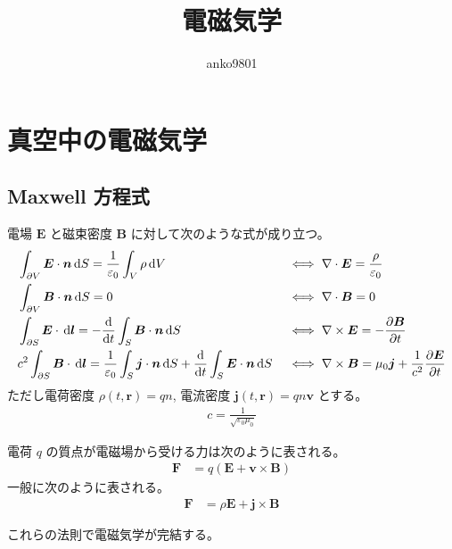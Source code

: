 \documentclass[uplatex,dvipdfmx,a4paper,11pt]{jlreq}
\title{電磁気学}
\author{anko9801}
\newcommand{\EE}{\bm{E}}
\newcommand{\BB}{\bm{B}}
\newcommand{\rr}{\bm{r}}
\newcommand{\vnabla}{\mathbf{\nabla}}
\numberwithin{equation}{section}
\theoremstyle{definition}
\begin{document}
\maketitle
\tableofcontents
\clearpage

\section{真空中の電磁気学}
\subsection{Maxwell 方程式}
\begin{definition}
  電場 $\EE$ と磁束密度 $\BB$ に対して次のような式が成り立つ。
  \begin{align}
     & \int_{\partial V}\EE\cdot\bm{n}\dl{S} = \frac{1}{\varepsilon_0}\int_V\rho\dl{V}                                                       &  & \iff \vnabla\cdot\EE  = \frac{\rho}{\varepsilon_0}                               \\
     & \int_{\partial V}\BB\cdot\bm{n}\dl{S} = 0                                                                                             &  & \iff \vnabla\cdot\BB  = 0                                                        \\
     & \int_{\partial S}\EE\cdot\dl{\bm{l}} = -\diff{}{t}\int_S\BB\cdot\bm{n}\dl{S}                                                          &  & \iff \vnabla\times\EE = -\diffp{\BB}{t}                                          \\
     & c^2\int_{\partial S}\BB\cdot\dl{\bm{l}} = \frac{1}{\varepsilon_0}\int_S\bm{j}\cdot\bm{n}\dl{S} + \diff{}{t}\int_S\EE\cdot\bm{n}\dl{S} &  & \iff \vnabla\times\BB = \mu_0\bm{j} + \frac{1}{c^2}\diffp{\EE}{t} \label{Ampere}
  \end{align}
  ただし電荷密度 $\rho(t, \rr) = qn$, 電流密度 $\bm{j}(t, \rr) = qn\bm{v}$ とする。
  \begin{align}
    c = \frac{1}{\sqrt{\varepsilon_0\mu_0}}
  \end{align}
\end{definition}
\begin{definition}[Lorentz 力]
  電荷 $q$ の質点が電磁場から受ける力は次のように表される。
  \begin{align}
    \bm{F} & = q(\EE + \bm{v}\times\BB)
  \end{align}
  一般に次のように表される。
  \begin{align}
    \bm{F} & = \rho\EE + \bm{j}\times\BB
  \end{align}
\end{definition}
これらの法則で電磁気学が完結する。
\end{document}
